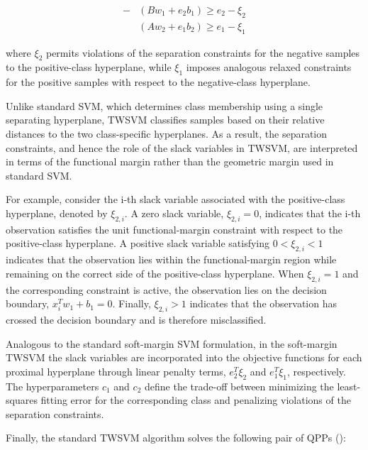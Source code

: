 \documentclass[12pt]{report} %
\begin{document}
\begin{subequations}
\begin{align}
-&(Bw_1+e_2b_1) \geq e_2 - \xi_2 \\
& (Aw_2+e_1b_2) \geq e_1 - \xi_1
\end{align}
\end{subequations}

where $\xi_2$ permits violations of the separation constraints for the negative samples to the positive-class hyperplane, while $\xi_1$ imposes analogous relaxed constraints for the positive samples with respect to the negative-class hyperplane.

\newpage

Unlike standard SVM, which determines class membership using a single separating hyperplane, TWSVM classifies samples based on their relative distances to the two class-specific hyperplanes. As a result, the separation constraints, and hence the role of the slack variables in TWSVM, are interpreted in terms of the functional margin rather than the geometric margin used in standard SVM.

For example, consider the i-th slack variable associated with the positive-class hyperplane, denoted by $\xi_{2,i}$. A zero slack variable, $\xi_{2,i} = 0$, indicates that the i-th observation satisfies the unit functional-margin constraint with respect to the positive-class hyperplane. A positive slack variable satisfying $0<\xi_{2,i}< 1$ indicates that the observation lies within the functional-margin region while remaining on the correct side of the positive-class hyperplane. When $\xi_{2,i} = 1$ and the corresponding constraint is active, the observation lies on the decision boundary, $x_i^{T}w_1 + b_1 = 0$. Finally, $\xi_{2,i} > 1$ indicates that the observation has crossed the decision boundary and is therefore misclassified.

Analogous to the standard soft-margin SVM formulation, in the soft-margin TWSVM the slack variables are incorporated into the objective functions for each proximal hyperplane through linear penalty terms, $e_2^{T}\xi_2$ and $e_1^{T}\xi_1$, respectively. The hyperparameters $c_1$ and $c_2$ define the trade-off between minimizing the least-squares fitting error for the corresponding class and penalizing violations of the separation constraints.

Finally, the standard TWSVM algorithm solves the following pair of QPPs (\cite{khemchandani2007twin}):
\end{document}
